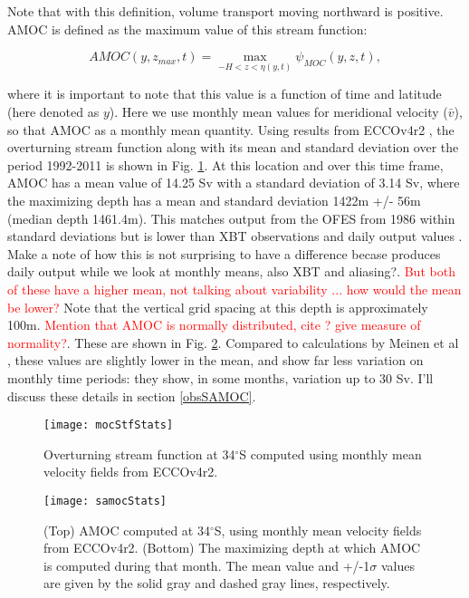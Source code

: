 \documentclass[a4paper,11pt]{article}
\newcommand{\red}[1]{\textcolor{red}{#1}}
\newcommand{\degSym}{$^{\circ}$}
\begin{document}
   Note that with this definition, volume transport moving northward is positive. AMOC is defined as the maximum value of this stream function: 
   
   \begin{equation}
    AMOC(y,z_{max},t) = \max_{-H < z < \eta(y,t)}{\psi_{MOC}(y,z,t)} ,
    \label{eq:amoc}
   \end{equation}

   where it is important to note that this value is a function of time and latitude (here denoted as $y$). Here we use monthly mean values for meridional velocity ($\bar{v}$), so that AMOC as a monthly mean quantity. Using results from ECCOv4r2 \cite{forgetECCOv4}, the overturning stream function along with its mean and standard deviation over the period 1992-2011 is shown in Fig. \ref{fig:mocStfStats}. At this location and over this time frame, AMOC has a mean value of 14.25 Sv with a standard deviation of 3.14 Sv, where the maximizing depth has a mean and standard deviation 1422m +/- 56m (median depth 1461.4m). This matches output from the OFES from 1986 within standard deviations \cite{dongOFES} but is lower than XBT observations \cite{dong2009} and daily output values \cite{meinenSamoc}. Make a note of how this is not surprising to have a difference becase \cite{meinenSamoc} produces daily output while we look at monthly means, also XBT and aliasing?. \red{But both of these have a higher mean, not talking about variability ... how would the mean be lower?} Note that the vertical grid spacing at this depth is approximately 100m. \red{Mention that AMOC is normally distributed, cite \cite{wunschAmoc}? give measure of normality?}. These are shown in Fig. \ref{fig:samocStats}. Compared to calculations by Meinen et al \cite{meinenSamoc}, these values are slightly lower in the mean, and show far less variation on monthly time periods: they show, in some months, variation up to 30 Sv. I'll discuss these details in section \ref{obsSAMOC}. 

   
   \begin{figure}
    \centering
    \texttt{[image: mocStfStats]}
    \caption{Overturning stream function at 34\degSym S computed using monthly mean velocity fields from ECCOv4r2.}
    \label{fig:mocStfStats}
   \end{figure}
   
   \begin{figure}
    \centering
    \texttt{[image: samocStats]}
    \caption{(Top) AMOC computed at 34\degSym S, using monthly mean velocity fields from ECCOv4r2. (Bottom) The maximizing depth at which AMOC is computed during that month. The mean value and +/-1$\sigma$ values are given by the solid gray and dashed gray lines, respectively.}
    \label{fig:samocStats}
   \end{figure}
\end{document}
